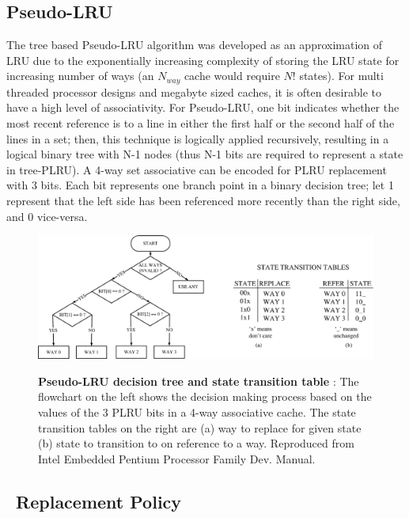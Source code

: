 \subsection{Pseudo-LRU}

The tree based Pseudo-LRU algorithm was developed as an approximation of LRU due to the exponentially increasing complexity of storing the LRU state for increasing number of ways (an $N_{way}$ cache would require $N!$ states). For multi threaded processor designs and megabyte sized caches, it is often desirable to have a high level of associativity. For Pseudo-LRU, one bit indicates whether the most recent reference is to a line in either the first half or the second half of the lines in a set; then, this technique is logically applied recursively, resulting in a logical binary tree with N-1 nodes (thus N-1 bits are required to represent a state in tree-PLRU). A 4-way set associative can be encoded for PLRU replacement with 3 bits. Each bit represents one branch point in a binary decision tree; let 1 represent that the left side has been referenced more recently than the right side, and 0 vice-versa. 
\\ 
\begin{figure}[hb]
  \includegraphics[width=\textwidth]{files/Figures/06-PLRU.pdf}
  \\
  \caption[Pseudo LRU]{\textbf{Pseudo-LRU decision tree and state transition table} : The flowchart on the left shows the decision making process based on the values of the 3 PLRU bits in a 4-way associative cache. The state transition tables on the right are (a) way to replace for given state (b) state to transition to on reference to a way. Reproduced from Intel Embedded Pentium Processor Family Dev. Manual\cite{manual:IntelProcessor}.}
  \label{fig:plru}
\end{figure}

\subsection{\AC\ Replacement Policy}

